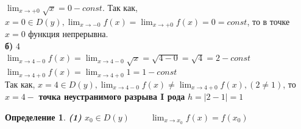 \documentclass[12pt, a4paper]{article}
\newtheorem{definition}{Определение}[subsection]
\theoremstyle{remark}
\begin{document}
	$\lim_{x \to +0} \sqrt{x} = 0 - const$. Так как, $x = 0 \in D(y), \lim_{x \to -0} f(x) = \lim_{x \to +0} f(x) = 0 = const$, то в точке $x = 0$ функция непрерывна. \\
	
	\textbf{б)} 4 \\
	
	$\lim_{x \to 4 - 0} f(x) = \lim_{x \to 4 - 0} \sqrt{x} = \sqrt{4 - 0} = \sqrt{4} = 2 - const$ \\
	
	$\lim_{x \to 4 + 0} f(x) = \lim_{x \to 4 + 0} 1 = 1 - const$ \\
	
	Так как, $x = 4 \in D(y), \lim_{x \to 4 - 0} f(x) \neq \lim_{x \to 4 + 0} f(x), (2 \neq 1)$, то $x = 4 -$ \textbf{точка неустранимого разрыва I рода} $h = |2 - 1| = 1$ 
	
	\begin{definition}
		\textbf{(1)} $x_0 \in D(y) \hspace{1cm} \lim_{x \to x_0} f(x) = f(x_0)$
	\end{definition}
	
\end{document}

